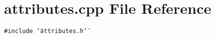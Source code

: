 \section{attributes.cpp File Reference}
\label{attributes_8cpp}
{\tt \#include \char`\"{}attributes.h\char`\"{}}\par

